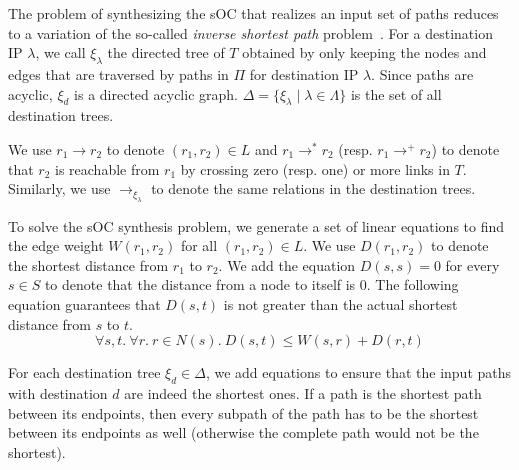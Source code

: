 The problem of synthesizing the
sOC that realizes an input set of paths reduces to a
variation of the so-called {\em inverse shortest path} 
problem~\cite{isp}. 
For a destination IP $\lambda$, we call $\xi_\lambda$ 
the directed tree of $T$ 
obtained by only keeping the nodes and edges 
that are traversed by paths in $\Pi$ for 
destination IP $\lambda$.
Since paths are acyclic, $\xi_d$ is a directed acyclic graph.
$\Delta=\{\xi_\lambda\mid \lambda \in \Lambda\}$ is   
the set of all destination trees. 

We use  $r_1\rightarrow r_2$ to denote $(r_1,r_2)\in L$ and
$r_1\rightarrow^* r_2$ (resp. $r_1\rightarrow^+ r_2$) to denote 
that $r_2$ is reachable from $r_1$ by crossing zero 
(resp. one) or more links in $T$.
Similarly, we use $\rightarrow_{\xi_\lambda}$ 
to denote the same relations in the destination trees.


To solve the sOC synthesis problem, 
we generate a set of linear equations
to find the edge weight $W(r_1, r_2)$ 
for all $(r_1, r_2) \in L$.
We use 
$D(r_1, r_2)$ to denote the 
shortest distance from $r_1$ to $r_2$.
We add the equation $D(s,s) = 0$ 
for every $s\in S$ to denote that the distance
from a node to itself is $0$.
The
following equation guarantees that $D(s,t)$ is not greater than 
the actual shortest distance from $s$ to $t$.
\begin{equation} \label{eq:dist}
\forall s, t. ~\forall r. ~r \in N(s).~
D(s, t) \leq W(s, r) + D(r, t)
\end{equation}

For each destination tree $\xi_d\in\Delta$, we add equations to ensure 
that the input paths with destination $d$ are indeed the shortest ones.
 If a path
is the shortest path between its endpoints, then every 
subpath of the path has to be the shortest between its endpoints
as well (otherwise the complete path would not be the shortest).

